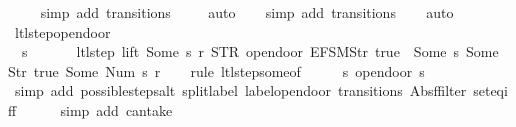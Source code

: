 \begin{isabellebody}
\ \ \ \isamarkupfalse%
\ {\isacharparenleft}simp\ add{\isacharcolon}\ transitions{\isacharparenright}\isanewline
\ \ \ \isamarkupfalse%
\ auto{\isacharbrackleft}{}{\isacharbrackright}\isanewline
\ \ \isamarkupfalse%
\ {\isacharparenleft}simp\ add{\isacharcolon}\ transitions{\isacharparenright}\isanewline
\ \ \isamarkupfalse%
\ auto%
\endisatagproof
{\isafoldproof}%
%
\isadelimproof
\isanewline
%
\endisadelimproof
\isanewline
{}\isamarkupfalse%
\ ltl{\isacharunderscore}step{\isacharunderscore}opendoor{\isacharcolon}\isanewline
\ \ {\isachardoublequoteopen}s\ {\isasymin}\ {\isacharbraceleft}{}{\isacharcomma}\ {}{\isacharcomma}\ {}{\isacharcomma}\ {}{\isacharbraceright}\ {\isasymLongrightarrow}\ ltl{\isacharunderscore}step\ lift\ {\isacharparenleft}Some\ s{\isacharparenright}\ r\ {\isacharparenleft}STR\ {\isacharprime}{\isacharprime}opendoor{\isacharprime}{\isacharprime}{\isacharcomma}\ {\isacharbrackleft}EFSM{\isachardot}Str\ {\isacharprime}{\isacharprime}true{\isacharprime}{\isacharprime}{\isacharbrackright}{\isacharparenright}\ {\isacharequal}\ {\isacharparenleft}Some\ s{\isacharcomma}\ {\isacharbrackleft}Some\ {\isacharparenleft}Str\ {\isacharprime}{\isacharprime}true{\isacharprime}{\isacharprime}{\isacharparenright}{\isacharcomma}\ Some\ {\isacharparenleft}Num\ {\isacharparenleft}s{\isacharminus}{}{\isacharparenright}{\isacharparenright}{\isacharbrackright}{\isacharcomma}\ r{\isacharparenright}{\isachardoublequoteclose}\isanewline
%
\isadelimproof
\ \ %
\endisadelimproof
%
\isatagproof
{}\isamarkupfalse%
\ {\isacharparenleft}rule\ ltl{\isacharunderscore}step{\isacharunderscore}some{\isacharbrackleft}of\ {\isacharunderscore}\ {\isacharunderscore}\ {\isacharunderscore}\ {\isacharunderscore}\ {\isacharunderscore}\ s\ {\isachardoublequoteopen}opendoor\ {\isacharparenleft}s{\isacharminus}{}{\isacharparenright}{\isachardoublequoteclose}{\isacharbrackright}{\isacharparenright}\isanewline
\ \ \ \ \isamarkupfalse%
\ {\isacharparenleft}simp\ add{\isacharcolon}\ possible{\isacharunderscore}steps{\isacharunderscore}alt{}\ split{\isacharunderscore}label\ label{\isacharunderscore}opendoor\ transitions\ Abs{\isacharunderscore}ffilter\ set{\isacharunderscore}eq{\isacharunderscore}iff{\isacharparenright}\isanewline
\ \ \ \ \isamarkupfalse%
\ {\isacharparenleft}simp\ add{\isacharcolon}\ can{\isacharunderscore}take{\isacharparenright}\isanewline

\end{isabellebody}
